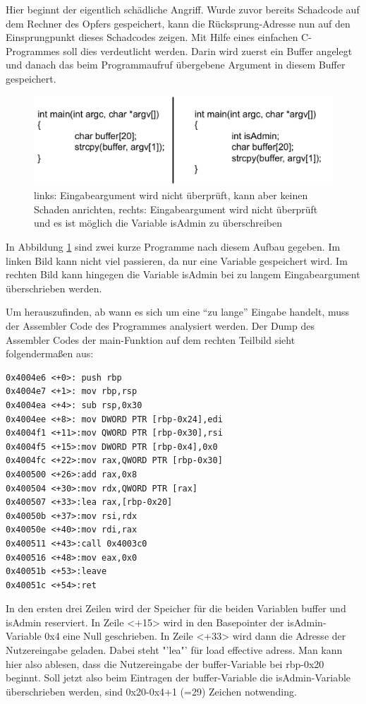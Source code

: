 Hier beginnt der eigentlich schädliche Angriff. Wurde zuvor bereits Schadcode auf dem Rechner des Opfers gespeichert, kann die Rücksprung-Adresse nun auf den Einsprungpunkt dieses Schadcodes zeigen. Mit Hilfe eines einfachen C-Programmes soll dies verdeutlicht werden. Darin wird zuerst ein Buffer angelegt und danach das beim Programmaufruf übergebene Argument in diesem Buffer gespeichert.

\begin{figure}
	\centering
	\includegraphics[width=\textwidth]{images/BufferOverflow/beispielCode}
	\caption{links: Eingabeargument wird nicht überprüft, kann aber keinen Schaden anrichten, rechts: Eingabeargument wird nicht überprüft und es ist möglich die Variable isAdmin zu überschreiben}
	\label{fig:beispielCode}
\end{figure}

In Abbildung \ref{fig:beispielCode} sind zwei kurze Programme nach diesem Aufbau gegeben. Im linken Bild kann nicht viel passieren, da nur eine Variable gespeichert wird. Im rechten Bild kann hingegen die Variable isAdmin bei zu langem Eingabeargument überschrieben werden.

Um herauszufinden, ab wann es sich um eine \enquote{zu lange} Eingabe handelt, muss der Assembler Code des Programmes analysiert werden.
Der Dump des Assembler Codes der main-Funktion auf dem rechten Teilbild sieht folgendermaßen aus:

\begin{lstlisting}
0x4004e6 <+0>: push rbp
0x4004e7 <+1>: mov rbp,rsp
0x4004ea <+4>: sub rsp,0x30
0x4004ee <+8>: mov DWORD PTR [rbp-0x24],edi
0x4004f1 <+11>:mov QWORD PTR [rbp-0x30],rsi
0x4004f5 <+15>:mov DWORD PTR [rbp-0x4],0x0
0x4004fc <+22>:mov rax,QWORD PTR [rbp-0x30]
0x400500 <+26>:add rax,0x8
0x400504 <+30>:mov rdx,QWORD PTR [rax]
0x400507 <+33>:lea rax,[rbp-0x20]
0x40050b <+37>:mov rsi,rdx
0x40050e <+40>:mov rdi,rax
0x400511 <+43>:call 0x4003c0
0x400516 <+48>:mov eax,0x0
0x40051b <+53>:leave
0x40051c <+54>:ret
\end{lstlisting}

In den ersten drei Zeilen wird der Speicher für die beiden Variablen buffer und isAdmin reserviert. In Zeile <+15> wird in den Basepointer der isAdmin-Variable 0x4 eine Null geschrieben. In Zeile <+33> wird dann die Adresse der Nutzereingabe geladen. Dabei steht "'lea"' für load effective adress. Man kann hier also ablesen, dass die Nutzereingabe der buffer-Variable bei rbp-0x20 beginnt. Soll jetzt also beim Eintragen der buffer-Variable die isAdmin-Variable überschrieben werden, sind 0x20-0x4+1 (=29) Zeichen notwending.

